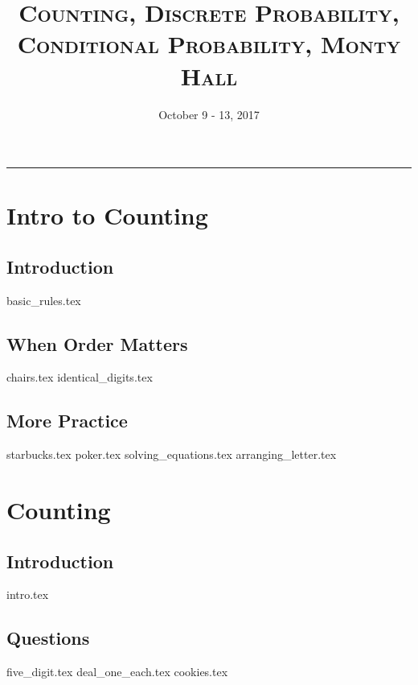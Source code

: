 \documentclass{exam}
\title{\textsc{Counting, Discrete Probability, Conditional Probability, Monty Hall}}
\date{October 9 - 13, 2017}
\begin{document}
\maketitle
\rule{\textwidth}{0.15em}
\fontsize{12}{15}\selectfont
\thispagestyle{empty}


\section{Intro to Counting}
\subsection{Introduction}
{basic_rules.tex}
\subsection{When Order Matters}
\begin{questions}
{chairs.tex}
{identical_digits.tex}
\end{questions}
\subsection{More Practice}
\begin{questions}
{starbucks.tex}
{poker.tex}
{solving_equations.tex}
{arranging_letter.tex}
\end{questions}

\section{Counting}
\subsection{Introduction}
{intro.tex}
\subsection{Questions}
\begin{questions}
{five_digit.tex}
{deal_one_each.tex}
{cookies.tex}
\end{questions}
\end{document}
